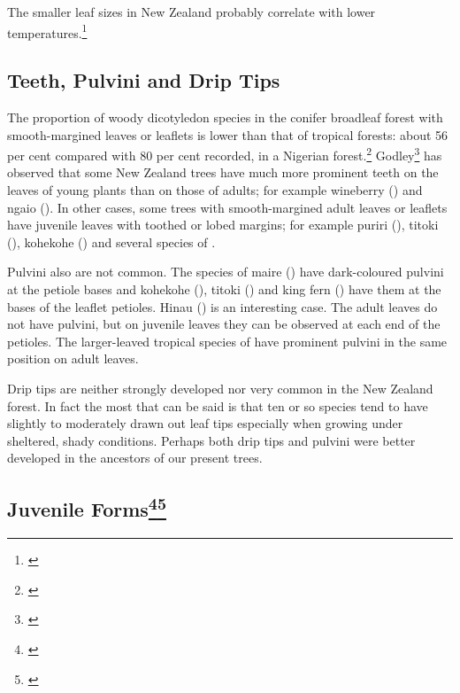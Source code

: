 The smaller leaf sizes in New Zealand probably correlate with lower temperatures.\footnote{\cite{dawson1986floristic}}

\subsection{Teeth, Pulvini and Drip Tips}

The proportion of woody dicotyledon species in the conifer broadleaf forest with smooth-margined leaves or leaflets is lower than that of tropical forests: about 56 per cent compared with 80 per cent recorded, in a Nigerian forest.\footnote{\cite{richards1952tropical}}
Godley\footnote{\cite{godley1985paths}} has observed that some New Zealand trees have much more prominent teeth on the leaves of young plants than on those of adults; for example wineberry () and ngaio ().
In other cases, some trees with smooth-margined adult leaves or leaflets have juvenile leaves with toothed or lobed margins; for example puriri (), titoki (), kohekohe () and several species of .

Pulvini also are not common.
The species of maire () have dark-coloured pulvini at the petiole bases and kohekohe (), titoki () and king fern () have them at the bases of the leaflet petioles.
Hinau () is an interesting case.
The adult leaves do not have pulvini, but on juvenile leaves they can be observed at each end of the petioles.
The larger-leaved tropical species of  have prominent pulvini in the same position on adult leaves.

Drip tips are neither strongly developed nor very common in the New Zealand forest.
In fact the most that can be said is that ten or so species tend to have slightly to moderately drawn out leaf tips especially when growing under sheltered, shady conditions.
Perhaps both drip tips and pulvini were better developed in the ancestors of our present trees.

\subsection[Juvenile Forms]{Juvenile Forms\footnote{\cite{godley1985paths}}\footnote{\cite{philipson1964habit}}}

